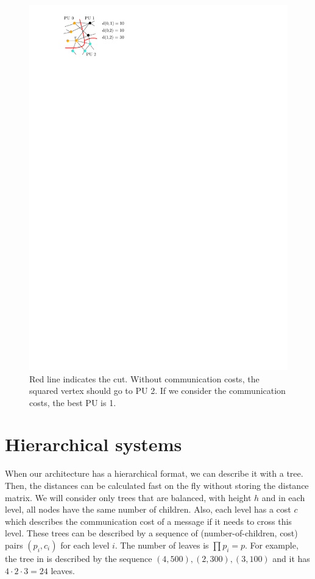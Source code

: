 \documentclass[a4paper,10pt]{article}
\begin{document}
\begin{figure}
\centering
\includegraphics[scale=1.6]{local_search_PU_dist}
\caption{Red line indicates the cut. Without communication costs, the squared vertex should go to 
PU 2. If we consider the communication costs, the best PU is 1.}
\label{fig:lr}
\end{figure}


\section{Hierarchical systems}

When our architecture has a hierarchical format, we can describe it with a tree. Then, the distances
can be calculated fast on the fly without storing the distance matrix.
We will consider only trees that are balanced, with height $h$ and in each level, all nodes have
the same number of children. Also, each level has a cost $c$ which describes the communication
cost of a message if it needs to cross this level.
These trees can be described by a sequence of (number-of-children, cost) pairs
$(p_i,c_i)$
for each level $i$. The number of leaves is $\prod p_i=p$.
For example, the tree in  is described by the sequence $(4,500),(2,300), (3,100)$
and it has $4\cdot 2 \cdot 3 = 24$ leaves.
 
\end{document}
